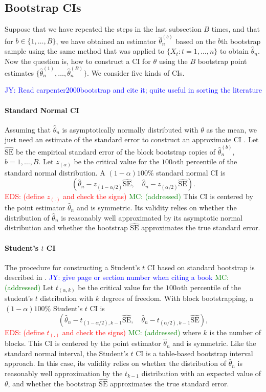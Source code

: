 \documentclass[12pt, letterpaper, titlepage]{article}
\newcommand{\jy}[1]{\textcolor{blue}{JY: #1}}
\newcommand{\eds}[1]{\textcolor{red}{EDS: (#1)}}
\newcommand{\mc}[1]{\textcolor{green}{MC: (#1)}}
\begin{document}
\subsection{Bootstrap CIs}

Suppose that we have repeated the steps in the last subsection $B$ times, and
that for $b \in \{1, \ldots, B\}$, we have obtained an estimator
$\hat\theta_n^{(b)}$ based on the $b$th bootstrap sample using the same method
that was applied to $\{X_t: t = 1, \ldots, n\}$ to obtain $\hat\theta_n$.
Now the question is, how to construct a CI for $\theta$
using the $B$ bootstrap point estimates
$\{\hat\theta_n^{(1)}, \ldots, \hat\theta_n^{(B)}\}$.
We consider five kinds of CIs.

\jy{Read carpenter2000bootstrap and cite it; quite useful in sorting the literature}

\paragraph{Standard Normal CI}
Assuming that $\hat\theta_n$ is asymptotically normally distributed with
$\theta$ as the mean, we just need an estimate of the standard error to
construct an approximate CI \citep[p.168]{efron1993introduction}.
Let $\widehat{\text{SE}}$ be the empirical standard error of the block bootstrap
copies of $\hat\theta_n^{(b)}$, $b = 1, \ldots, B$. Let $z_{(\alpha)}$ be the critical value for the $100\alpha$th percentile of the standard normal distribution.
A $(1 - \alpha)100\%$ standard normal CI is
\[
(\hat{\theta}_{n} - z_{(1-\alpha/2)}\widehat{\text{SE}}, \quad
\hat{\theta}_{n} - z_{(\alpha/2)}\widehat{\text{SE}}).
\]
\eds{define $z_{(.)}$ and check the signs} \mc{addressed}
This CI is centered by the point estimator $\hat\theta_n$ and is symmetric.
Its validity relies on whether the distribution of $\hat\theta_n$ is reasonably
well approximated by its asymptotic normal distribution and whether the
bootstrap $\widehat{\text{SE}}$ approximates the true standard error.

\paragraph{Student's $t$ CI}
The procedure for constructing a Student's $t$ CI based on standard bootstrap is
described in \citet[p.158]{efron1993introduction}. \jy{give page or section number when
  citing a book} \mc{addressed} Let $t_{(\alpha, k)}$ be the critical value for the $100\alpha$th percentile of the student's $t$ distribution with $k$ degrees of freedom.
With block bootstrapping, a $(1 - \alpha)100\%$ Student's $t$ CI is
\[
(\hat{\theta}_{n} - t_{(1-\alpha/2), k - 1}\hat{\text{SE}}, \quad
\hat{\theta}_{n} - t_{(\alpha/2), k -1}\hat{\text{SE}}),
\]
\eds{define $t_{(.)}$ and check the signs}  \mc{addressed}
where $k$ is the number of blocks.
This CI is centered by the point estimator $\hat\theta_n$ and is symmetric.
Like the standard 
normal interval, the Student's $t$ CI is a table-based bootstrap interval
approach. In this case,
its validity relies on whether the distribution of $\hat\theta_n$ is
reasonably well approximation by the $t_{k-1}$ distribution with an
expected value of $\theta$, and whether the bootstrap 
$\widehat{\text{SE}}$ approximates the true standard error.
\end{document}
